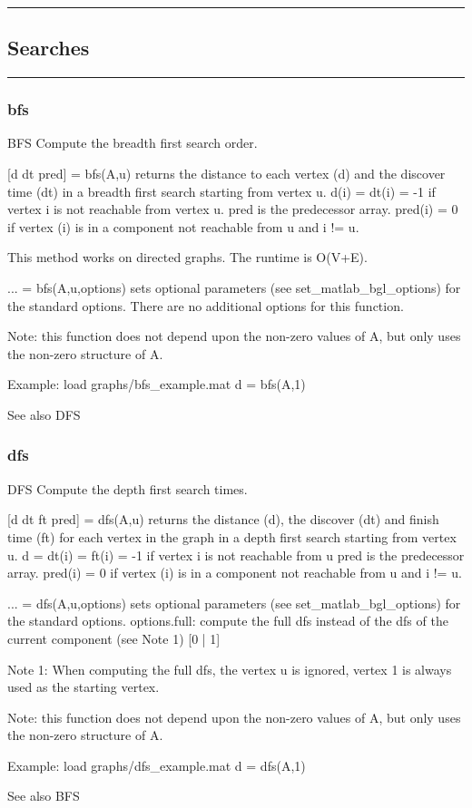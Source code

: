 \hrule
\subsection*{Searches}
\vspace{1cm}
\hrule
\subsubsection*{bfs}
\begin{mcode}
  BFS Compute the breadth first search order.
 
  [d dt pred] = bfs(A,u) returns the distance to each vertex (d) and the  
  discover time (dt) in a breadth first search starting from vertex u.
     d(i) = dt(i) = -1 if vertex i is not reachable from vertex u.
  pred is the predecessor array.  pred(i) = 0 if vertex (i)  
  is in a component not reachable from u and i != u.
 
  This method works on directed graphs.
  The runtime is O(V+E).
 
  ... = bfs(A,u,options) sets optional parameters (see 
  set_matlab_bgl_options) for the standard options.
    There are no additional options for this function.
 
  Note: this function does not depend upon the non-zero values of A, but
  only uses the non-zero structure of A.
 
  Example:
     load graphs/bfs_example.mat
     d = bfs(A,1)
 
  See also DFS
\end{mcode}
\newpage
\subsubsection*{dfs}
\begin{mcode}
  DFS Compute the depth first search times.
 
  [d dt ft pred] = dfs(A,u) returns the distance (d), the discover (dt) and
  finish time (ft) for each vertex in the graph in a depth first search 
  starting from vertex u.
    d = dt(i) = ft(i) = -1 if vertex i is not reachable from u
  pred is the predecessor array.  pred(i) = 0 if vertex (i)  
  is in a component not reachable from u and i != u.
  
  ... = dfs(A,u,options) sets optional parameters (see 
  set_matlab_bgl_options) for the standard options.
    options.full: compute the full dfs instead of the dfs of
       the current component (see Note 1) [{0} | 1]
 
  Note 1: When computing the full dfs, the vertex u is ignored, vertex 1 is
  always used as the starting vertex.  
 
  Note: this function does not depend upon the non-zero values of A, but
  only uses the non-zero structure of A.
 
  Example:
     load graphs/dfs_example.mat
     d = dfs(A,1)
 
  See also BFS
\end{mcode}
\newpage
